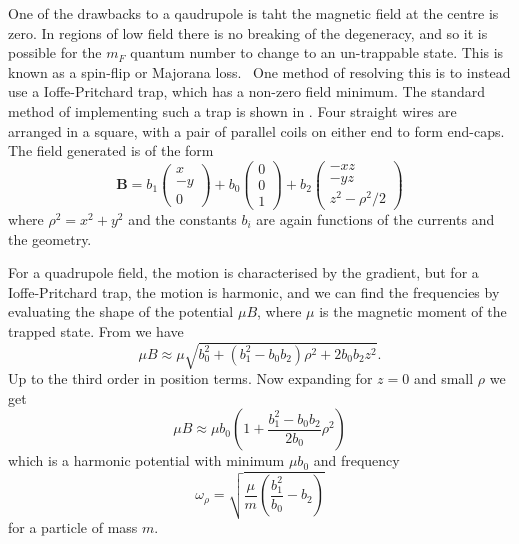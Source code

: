 One of the drawbacks to a qaudrupole is taht the magnetic field at the centre
is zero. In regions of low field there is no breaking of the degeneracy, and so
it is possible for the $m_F$ quantum number to change to an un-trappable state.
This is known as a spin-flip or Majorana loss.~\cite{} One method of resolving
this is to instead use a Ioffe-Pritchard trap, which has a non-zero field
minimum. The standard method of implementing such a trap is shown in
. Four straight wires are arranged in a
square, with a pair of parallel coils on either end to form end-caps. The field
generated is of the form~\cite{} %
%
\begin{equation}
  \mathbf{B} = b_1 \begin{pmatrix} x \\ -y \\ 0 \end{pmatrix}
  + b_0 \begin{pmatrix} 0 \\ 0 \\ 1 \end{pmatrix}
  + b_2 \begin{pmatrix} -xz \\ -yz \\ z^2 - \rho^2/2 \end{pmatrix}
  \label{theory:eqn:IP}
\end{equation}
%
where $\rho^2 = x^2 + y^2$ and the constants $b_i$ are again functions
of the currents and the geometry.

For a quadrupole field, the motion is characterised by the gradient, but for a
Ioffe-Pritchard trap, the motion is harmonic, and we can find the frequencies
by evaluating the shape of the potential $\mu B$, where $\mu$ is the magnetic
moment of the trapped state. From  we have
%
\begin{equation}
  \mu B \approx \mu \sqrt{b_0^2 + (b_1^2 -
  b_0b_2)\rho^2 + 2b_0b_2z^2}.
\end{equation}
%
Up to the third order in position terms. Now expanding for $z=0$ and small $\rho$ we get
%
\begin{equation}
  \mu B \approx \mu b_0\left(1 + \frac{b_1^2 -
    b_0b_2}{2b_0}\rho^2\right)
\end{equation}
%
which is a harmonic potential with minimum $\mu b_0$ and frequency
%
\begin{equation}
  \omega_\rho = \sqrt{\frac{\mu}{m}\left(\frac{b_1^2}{b_0}-b_2\right)}
\end{equation}
%
for a particle of mass $m$.

